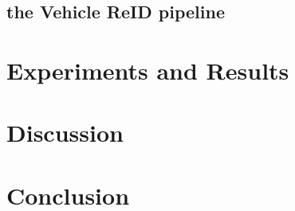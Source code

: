 \documentclass[conference]{IEEEtran} %
\begin{document}
	\subsection{the Vehicle ReID pipeline}
	
	
	
	
	 
		
	
	\section{Experiments and Results}
	
	\section{Discussion}
	
	\section{Conclusion}
	
	
	
\end{document}
